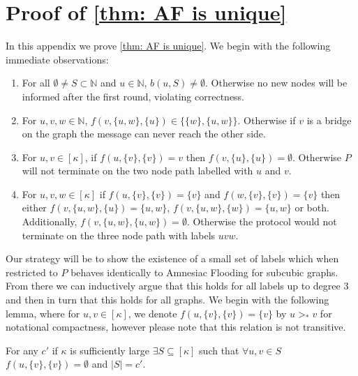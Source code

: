 \section{Proof of \cref{thm: AF is unique}}
\label{apx: Uniqueness}
In this appendix we prove \cref{thm: AF is unique}.
We begin with the following immediate observations:
\begin{observation}
    \;
    \label{obs: basic uniqueness properties}
    \begin{enumerate}
        \item For all $\emptyset\neq S \subset \mathbb{N}$ and $u \in \mathbb{N}$, $b(u,S)\neq \emptyset$. Otherwise no new nodes will be informed after the first round, violating correctness.
        \item For $u, v, w \in \mathbb{N}$, $f(v,\{u,w\},\{u\})\in \{\{w\},\{u,w\}\}$. Otherwise if $v$ is a bridge on the graph the message can never reach the other side.
        \item For $u, v \in [\kappa]$, if $f(u,\{v\},\{v\})=v$ then $f(v,\{u\},\{u\})=\emptyset$. Otherwise $P$ will not terminate on the two node path labelled with $u$ and $v$.
        \item For $u,v,w \in [\kappa]$ if $f(u,\{v\},\{v\})=\{v\}$ and $f(w,\{v\},\{v\})=\{v\}$ then either $f(v,\{u,w\},\{u\})=\{u,w\}$, $f(v,\{u,w\},\{w\})=\{u,w\}$ or both. Additionally, $f(v,\{u,w\},\{u,w\})=\emptyset$. Otherwise the protocol would not terminate on the three node path with labels $uvw$. \label{obs:p3 behaviour}
    \end{enumerate}
\end{observation}
Our strategy will be to show the existence of a small set of labels which when restricted to $P$ behaves identically to Amnesiac Flooding for subcubic graphs. From there we can inductively argue that this holds for all labels up to degree $3$ and then in turn that this holds for all graphs. We begin with the following lemma, where for $u,v \in [\kappa]$, we denote $f(u,\{v\},\{v\})=\{v\}$ by $u>_*v$ for notational compactness, however please note that this relation is not transitive. 
\begin{lemma}
\label{lemma: ramsey}
    For any $c'$ if $\kappa$ is sufficiently large $\exists S \subseteq [\kappa]$ such that $\forall u,v \in S$ $f(u,\{v\},\{v\})=\emptyset$ and $|S|=c'$.
\end{lemma}
